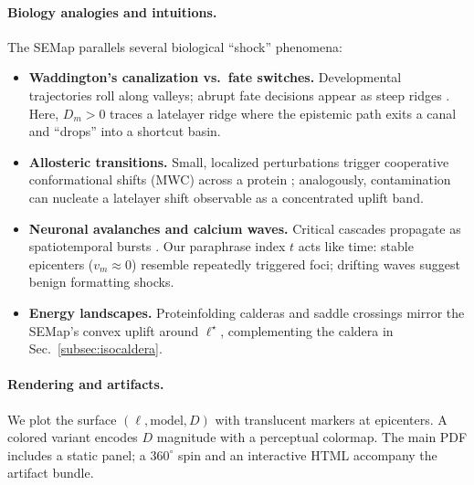 \documentclass[11pt]{article}
\begin{document}
\paragraph{Biology analogies and intuitions.}
The SE\textendash Map parallels several biological ``shock'' phenomena:
\begin{itemize}
\item \textbf{Waddington’s canalization vs.\ fate switches.} Developmental trajectories roll along valleys; abrupt fate decisions appear as steep ridges \citep{waddington1957strategy}. Here, $D_m{>}0$ traces a late\textendash layer ridge where the epistemic path exits a canal and ``drops'' into a shortcut basin.
\item \textbf{Allosteric transitions.} Small, localized perturbations trigger cooperative conformational shifts (MWC) across a protein \citep{monod1965mwc}; analogously, contamination can nucleate a late\textendash layer shift observable as a concentrated uplift band.
\item \textbf{Neuronal avalanches and calcium waves.} Critical cascades propagate as spatiotemporal bursts \citep{beggs2003neuronal,berridge1998calcium}. Our paraphrase index $t$ acts like time: stable epicenters ($v_m\!\approx\!0$) resemble repeatedly triggered foci; drifting waves suggest benign formatting shocks.
\item \textbf{Energy landscapes.} Protein\textendash folding calderas and saddle crossings \citep{onuchic1997protein} mirror the SE\textendash Map’s convex uplift around $\ell^\star$, complementing the caldera in Sec.~\ref{subsec:isocaldera}.
\end{itemize}

\paragraph{Rendering and artifacts.}
We plot the surface $(\ell,\text{model},D)$ with translucent markers at epicenters. A colored variant encodes $D$ magnitude with a perceptual colormap. The main PDF includes a static panel; a $360^\circ$ spin and an interactive HTML accompany the artifact bundle.
\end{document}
